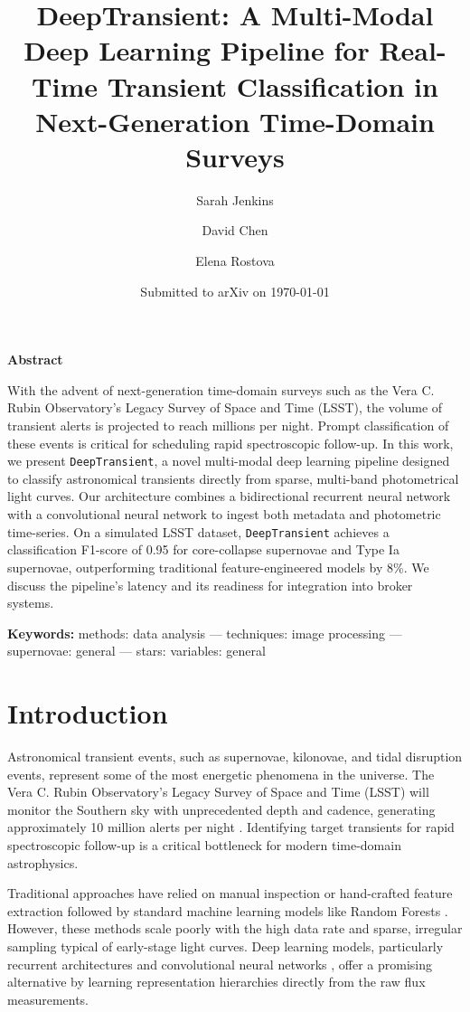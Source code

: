 \documentclass[11pt]{article}
\title{\vspace{-1.5cm}\bfseries\color{accentcolor}\Large DeepTransient: A Multi-Modal Deep Learning Pipeline for Real-Time Transient Classification in Next-Generation Time-Domain Surveys}
\author[1,2]{Sarah Jenkins}
\author[2]{David Chen}
\author[3]{Elena Rostova}
\affil[1]{Department of Astrophysics, University of California, Berkeley, CA 94720, USA}
\affil[2]{Lawrence Berkeley National Laboratory, 1 Cyclotron Rd, Berkeley, CA 94720, USA}
\affil[3]{Institute of Astronomy, University of Cambridge, Madingley Rd, Cambridge CB3 0HA, UK}
\date{\small\color{mutedgray}Submitted to arXiv on \today}
\begin{document}
\maketitle
\thispagestyle{plain} %

\begin{abstractbox}
\noindent\textbf{Abstract}

\smallskip
\noindent With the advent of next-generation time-domain surveys such as the Vera C. Rubin Observatory's Legacy Survey of Space and Time (LSST), the volume of transient alerts is projected to reach millions per night. Prompt classification of these events is critical for scheduling rapid spectroscopic follow-up. In this work, we present \texttt{DeepTransient}, a novel multi-modal deep learning pipeline designed to classify astronomical transients directly from sparse, multi-band photometrical light curves. Our architecture combines a bidirectional recurrent neural network with a convolutional neural network to ingest both metadata and photometric time-series. On a simulated LSST dataset, \texttt{DeepTransient} achieves a classification F1-score of 0.95 for core-collapse supernovae and Type Ia supernovae, outperforming traditional feature-engineered models by 8\%. We discuss the pipeline's latency and its readiness for integration into broker systems.

\medskip
\noindent\textbf{Keywords:} methods: data analysis --- techniques: image processing --- supernovae: general --- stars: variables: general
\end{abstractbox}

\section{Introduction}
Astronomical transient events, such as supernovae, kilonovae, and tidal disruption events, represent some of the most energetic phenomena in the universe. The Vera C. Rubin Observatory's Legacy Survey of Space and Time (LSST) will monitor the Southern sky with unprecedented depth and cadence, generating approximately 10 million alerts per night \cite{rubin2019}. Identifying target transients for rapid spectroscopic follow-up is a critical bottleneck for modern time-domain astrophysics.

Traditional approaches have relied on manual inspection or hand-crafted feature extraction followed by standard machine learning models like Random Forests \cite{narayan2018}. However, these methods scale poorly with the high data rate and sparse, irregular sampling typical of early-stage light curves. Deep learning models, particularly recurrent architectures \cite{charnock2017} and convolutional neural networks \cite{pasquet2019}, offer a promising alternative by learning representation hierarchies directly from the raw flux measurements.
\end{document}

